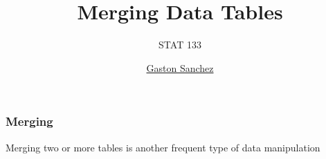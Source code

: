 \documentclass[12pt]{beamer}\usepackage[]{graphicx}\usepackage[]{color}
\title{Merging Data Tables}
\subtitle{STAT 133}
\author{\href{http://www.gastonsanchez.com}{Gaston Sanchez}}
\institute{\href{https://github.com/ucb-stat133/stat133-fall-2016}{\tt \scriptsize \color{foreground} github.com/ucb-stat133/stat133-fall-2016}}
\date{}
\begin{document}
{
  \frame{
    \titlepage
  } 
}


\begin{frame}
\begin{center}
\Huge{}
\end{center}
\end{frame}


\begin{frame}[fragile]
\frametitle{Merging}

{\Large 
 Merging two or more tables is another frequent type of data manipulation
}

\end{frame}

\end{document}
